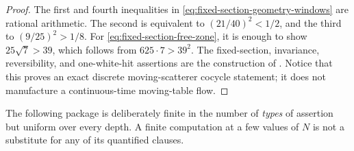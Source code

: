\documentclass[11pt]{article}
\begin{document}
\begin{proof}
The first and fourth inequalities in
\eqref{eq:fixed-section-geometry-windows} are rational arithmetic.  The
second is equivalent to $(21/40)^2<1/2$, and the third to
$(9/25)^2>1/8$.  For \eqref{eq:fixed-section-free-zone}, it is enough to
show $25\sqrt7>39$, which follows from $625\cdot7>39^2$.  The fixed-section,
invariance, reversibility, and one-white-hit assertions are the construction
of \cite[Sections~2.1--2.4]{StenlundRandom}.  Notice that this proves an
exact discrete moving-scatterer cocycle statement; it does not manufacture
a continuous-time moving-table flow.
\end{proof}

The following package is deliberately finite in the number of \emph{types}
of assertion but uniform over every depth.  A finite computation at a few
values of $N$ is not a substitute for any of its quantified clauses.
\end{document}
